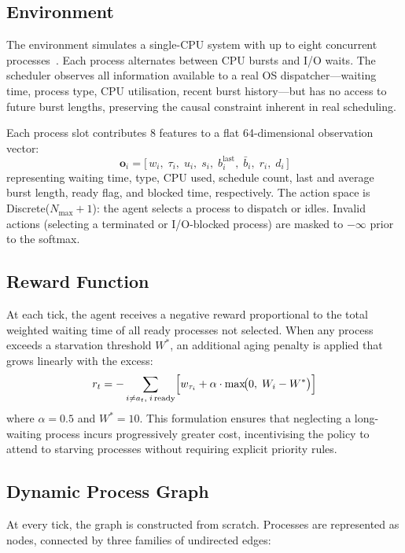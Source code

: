 \documentclass[conference]{IEEEtran}
\begin{document}
\subsection{Environment}

The environment simulates a single-CPU system with up to eight
concurrent processes~\cite{gymnasium}.  Each process alternates between
CPU bursts and I/O waits.  The scheduler observes all information
available to a real OS dispatcher---waiting time, process type, CPU
utilisation, recent burst history---but has no access to future burst
lengths, preserving the causal constraint inherent in real scheduling.

Each process slot contributes 8 features to a flat 64-dimensional
observation vector:
\[
  \mathbf{o}_i = \bigl[\,w_i,\; \tau_i,\; u_i,\; s_i,\;
    b^{\text{last}}_i,\; \bar{b}_i,\; r_i,\; d_i\,\bigr]
\]
representing waiting time, type, CPU used, schedule count, last and
average burst length, ready flag, and blocked time, respectively.  The
action space is Discrete($N_{\max}+1$): the agent selects a process to
dispatch or idles.  Invalid actions (selecting a terminated or
I/O-blocked process) are masked to $-\infty$ prior to the softmax.

\subsection{Reward Function}

At each tick, the agent receives a negative reward proportional to the
total weighted waiting time of all ready processes not selected.  When
any process exceeds a starvation threshold $W^*$, an additional aging
penalty is applied that grows linearly with the excess:
\begin{equation}
  r_t = -\sum_{i \neq a_t,\; i\,\text{ready}} \Bigl[w_{\tau_i}
        + \alpha \cdot \max\!\bigl(0,\; W_i - W^*\bigr)\Bigr]
  \label{eq:reward}
\end{equation}
where $\alpha = 0.5$ and $W^* = 10$.  This formulation ensures that
neglecting a long-waiting process incurs progressively greater cost,
incentivising the policy to attend to starving processes without
requiring explicit priority rules.

\subsection{Dynamic Process Graph}

At every tick, the graph is constructed from scratch.  Processes are
represented as nodes, connected by three families of undirected edges:
\end{document}
